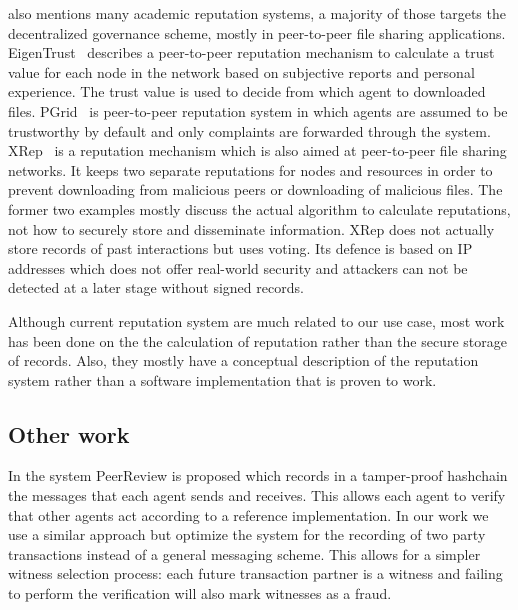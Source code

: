 \cite{HENDRIKX2015184} also mentions many academic reputation systems, a majority of those targets 
the decentralized governance scheme, mostly in peer-to-peer file sharing applications. 
EigenTrust~\cite{kamvar2003eigentrust} describes a peer-to-peer reputation mechanism to calculate a trust value for each 
node in the network based on subjective reports and personal experience. The trust value is used 
to decide from which agent to downloaded files. PGrid~\cite{aberer2003p} is peer-to-peer reputation
system in which agents are assumed to be trustworthy by default and only complaints are forwarded 
through the system. XRep~\cite{damiani2002xrep} is a reputation mechanism which is also aimed at 
peer-to-peer file sharing networks. It keeps two separate reputations for nodes and resources in
order to prevent downloading from malicious peers or downloading of malicious files. The former two
examples mostly discuss the actual algorithm to calculate reputations, not how to securely store and
disseminate information. XRep does not actually store records of past interactions but uses voting.
Its defence is based on IP addresses which does not offer real-world security and attackers can not
be detected at a later stage without signed records.

Although current reputation system are much related to our use case, most work has been done on the 
the calculation of reputation rather than the secure storage of records. Also, they mostly have a
conceptual description of the reputation system rather than a software implementation that is proven
to work.

\subsection{Other work}
In \cite{haeberlen2007peerreview} the system PeerReview is proposed which records in a tamper-proof
hashchain the messages that each agent sends and receives. This allows each agent to verify that 
other agents act according to a reference implementation. In our work we use a similar approach but
optimize the system for the recording of two party transactions instead of a general messaging scheme.
This allows for a simpler witness selection process: each future transaction partner is a witness and
failing to perform the verification will also mark witnesses as a fraud.




